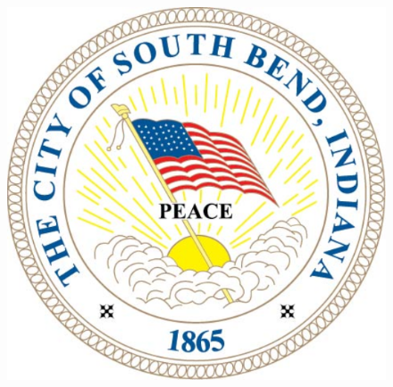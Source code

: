 \documentclass{beamer}
\begin{document}
\begin{frame}
\begin{center}
\begin{figure}
\begin{minipage}[t]{0.48\textwidth}
			\includegraphics[scale = 0.15]{seal}
		\end{minipage}\hfill
	\end{figure}
\end{center}
\end{frame}
\end{document}
